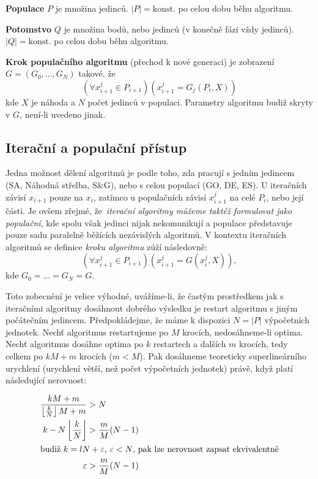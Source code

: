 \par{\textbf{Populace} $P$ je množina jedinců. $|P| =\text{konst.}$ po celou dobu běhu algoritmu.}

\par{\textbf{Potomstvo} $Q$ je množina bodů, nebo jedinců (v konečně fázi vždy jedinců). $|Q| =\text{konst.}$ po celou dobu běhu algoritmu.}

\par{\textbf{Krok populačního algoritmu} (přechod k nové generaci) je zobrazení $G = (G_0,...,G_N)$ takové, že
$$(\forall x^j_{i+1} \in P_{i+1})( x^j_{i+1} = G_j(P_i,X))$$}
kde $X$ je náhoda a $N$ počet jedinců v populaci. Parametry algoritmu budiž skryty v $G$, není-li uvedeno jinak.

\subsection{Iterační a populační přístup}\label{iteracni vs populacni}

Jedna možnost dělení algoritmů je podle toho, zda pracují s jedním jedincem (SA, Náhodná střelba, S\&G), nebo s celou populací (GO, DE, ES). U iteračních závisí $x_{i+1}$ pouze na $x_i$, zatímco u populačních závisí $x^j_{i+1}$ na celé $P_i$, nebo její části. Je ovšem zřejmé, že~\emph{iterační algoritmy můžeme taktéž formulovat jako populační}, kde spolu však jedinci nijak nekomunikují a populace představuje pouze sadu paralelně běžících nezávislých algoritmů. V kontextu iteračních algoritmů se definice \emph{kroku algoritmu} zúží následovně:
$$(\forall x^j_{i+1} \in P_{i+1})( x^j_{i+1} = G(x^j_i,X)),$$
kde $G_0 = ... = G_N = G$.

Toto zobecnění je velice výhodné, uvážíme-li, že častým prostředkem jak s iteračními algoritmy dosáhnout dobrého výsledku je restart algoritmu s jiným počátečním jedincem. Předpokládejme, že máme k dispozici $N =|P|$ výpočetních jednotek. Nechť algoritmus restartujeme po $M$ krocích, nedosáhneme-li optima. Nechť algoritmus dosáhne optima po $k$ restartech a dalších $m$ krocích, tedy celkem po $kM + m$ krocích ($m<M$). Pak dosáhneme teoreticky superlineárního urychlení (urychlení větší, než počet výpočetních jednotek) právě, když platí následující nerovnost:

\begin{align}
  \frac{kM+m}{\left\lfloor\frac{k}{N}\right\rfloor M+m} & > N \\
  k - N\left\lfloor\frac{k}{N}\right\rfloor & >\frac{m}{M}(N-1)\\
  \intertext{budiž $k=lN+\varepsilon$, $\varepsilon < N$, pak lze nerovnost zapsat ekvivalentně}
  \varepsilon & >\frac{m}{M}(N-1)
\end{align}

